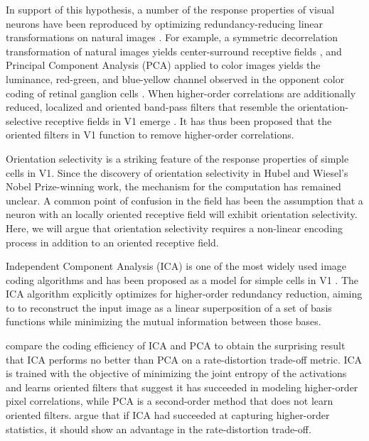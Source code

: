 In support of this hypothesis, a number of the response properties of visual neurons have been reproduced by optimizing redundancy-reducing linear transformations on natural images \parencite{atick1990towards}. For example, a symmetric decorrelation transformation of natural images yields center-surround receptive fields \parencite{atick1990towards}, and Principal Component Analysis (PCA) applied to color images yields the luminance, red-green, and blue-yellow channel observed in the opponent color coding of retinal ganglion cells \parencite{ruderman1998statistics, buchsbaum1983trichromacy}. When higher-order correlations are additionally reduced, localized and oriented band-pass filters that resemble the orientation-selective receptive fields in V1 emerge \parencite{bell1997independent, olshausen1999probabilistic}. It has thus been proposed that the oriented filters in V1 function to remove higher-order correlations.

Orientation selectivity is a striking feature of the response properties of simple cells in V1. Since the discovery of orientation selectivity in Hubel and Wiesel's Nobel Prize-winning work, the mechanism for the computation has remained unclear. A common point of confusion in the field has been the assumption that a neuron with an locally oriented receptive field will exhibit orientation selectivity. Here, we will argue that orientation selectivity requires a non-linear encoding process in addition to an oriented receptive field.

Independent Component Analysis (ICA) is one of the most widely used image coding algorithms and has been proposed as a model for simple cells in V1 \parencite{bell1997independent}. The ICA algorithm explicitly optimizes for higher-order redundancy reduction, aiming to to reconstruct the input image as a linear superposition of a set of basis functions while minimizing the mutual information between those bases.

 compare the  coding efficiency of ICA and PCA to obtain the surprising result that ICA performs no better than PCA on a rate-distortion trade-off metric. ICA is trained with the objective of minimizing the joint entropy of the activations and learns oriented filters that suggest it has succeeded in modeling higher-order pixel correlations, while PCA is a second-order method that does not learn oriented filters.  argue that if ICA had succeeded at capturing higher-order statistics, it should show an advantage in the rate-distortion trade-off.

